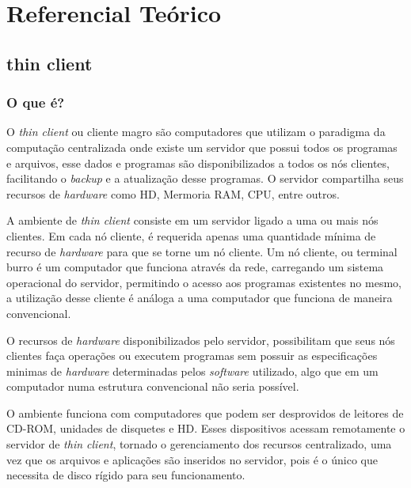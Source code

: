 \documentclass[
	12pt,				%
	openright,			%
	twoside,			%
	a4paper,			%
	chapter=TITLE,		%
	english,			%
	brazil				%
	]{abntex2}
\begin{document}
\part{Referencial Teórico}

\chapter{thin client}

\section{O que é?}

O \textit{thin client} ou cliente magro são computadores que utilizam o paradigma da computação centralizada onde existe um servidor que possui todos os programas e arquivos, esse dados e programas são disponibilizados a todos os nós clientes, facilitando o \textit{backup} e a atualização desse programas. O servidor compartilha seus recursos de \textit{hardware} como HD, Mermoria RAM, CPU, entre outros.\cite{ComoFuncionaThinClient, tanenbaum2010sistemas}

A ambiente de \textit{thin client} consiste em um servidor ligado a uma ou mais nós clientes. Em cada nó cliente, é requerida apenas uma quantidade mínima de recurso de \textit{hardware} para que se torne um nó cliente.\cite{TopologiaClienteThin} Um nó cliente, ou terminal burro é um computador que funciona através da rede, carregando um sistema operacional do servidor, permitindo o acesso aos  programas existentes no mesmo, a utilização desse cliente é análoga a uma computador que funciona de maneira convencional.\cite{ComoFuncionaThinClient, morimotoservidores}

O recursos de \textit{hardware} disponibilizados pelo servidor, possibilitam que seus nós clientes faça operações ou executem programas sem possuir as especificações minimas de \textit{hardware} determinadas pelos \textit{software} utilizado, algo que em um computador numa estrutura convencional não seria possível.\cite{tanenbaum2010sistemas}

O ambiente funciona com computadores que podem ser desprovidos de leitores de CD-ROM, unidades de disquetes e HD. Esses dispositivos acessam remotamente o servidor de \textit{thin client}, tornado o gerenciamento dos recursos centralizado, uma vez que os  arquivos e aplicações são inseridos no servidor, pois é o único que necessita de disco rígido para seu funcionamento.\cite{tanenbaum2010sistemas, ComoFuncionaThinClient}
\end{document}
